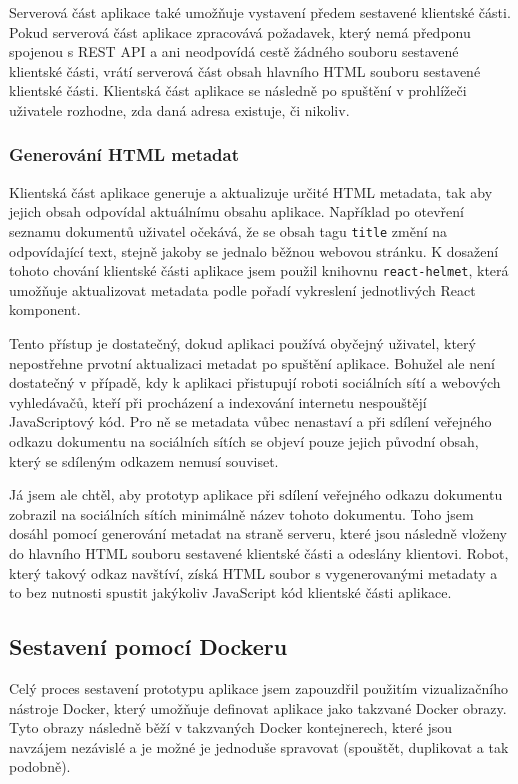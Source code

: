 Serverová část aplikace také umožňuje vystavení předem sestavené klientské části.
Pokud serverová část aplikace zpracovává požadavek, který nemá předponu spojenou s \gls{REST} \gls{API} a ani neodpovídá cestě žádného souboru sestavené klientské části, vrátí serverová část obsah hlavního \gls{HTML} souboru sestavené klientské části.
Klientská část aplikace se následně po spuštění v prohlížeči uživatele rozhodne, zda daná adresa existuje, či nikoliv.

\subsubsection{Generování HTML metadat}

Klientská část aplikace generuje a aktualizuje určité \gls{HTML} metadata, tak aby jejich obsah odpovídal aktuálnímu obsahu aplikace.
Například po otevření seznamu dokumentů uživatel očekává, že se obsah tagu \texttt{title} změní na odpovídající text, stejně jakoby se jednalo běžnou webovou stránku.
K dosažení tohoto chování klientské části aplikace jsem použil knihovnu \texttt{react-helmet}, která umožňuje aktualizovat metadata podle pořadí vykreslení jednotlivých React komponent.

Tento přístup je dostatečný, dokud aplikaci používá obyčejný uživatel, který nepostřehne prvotní aktualizaci metadat po spuštění aplikace.
Bohužel ale není dostatečný v případě, kdy k aplikaci přistupují roboti sociálních sítí a webových vyhledávačů, kteří při procházení a indexování internetu nespouštějí JavaScriptový kód.
Pro ně se metadata vůbec nenastaví a při sdílení veřejného odkazu dokumentu na sociálních sítích se objeví pouze jejich původní obsah, který se sdíleným odkazem nemusí souviset.

Já jsem ale chtěl, aby prototyp aplikace při sdílení veřejného odkazu dokumentu zobrazil na sociálních sítích minimálně název tohoto dokumentu.
Toho jsem dosáhl pomocí generování metadat na straně serveru, které jsou následně vloženy do hlavního \gls{HTML} souboru sestavené klientské části a odeslány klientovi.
Robot, který takový odkaz navštíví, získá \gls{HTML} soubor s vygenerovanými metadaty a to bez nutnosti spustit jakýkoliv JavaScript kód klientské části aplikace.

\subsection{Sestavení pomocí Dockeru}

Celý proces sestavení prototypu aplikace jsem zapouzdřil použitím vizualizačního nástroje Docker, který umožňuje definovat aplikace jako takzvané Docker obrazy.
Tyto obrazy následně běží v takzvaných Docker kontejnerech, které jsou navzájem nezávislé a je možné je jednoduše spravovat (spouštět, duplikovat a tak podobně).

